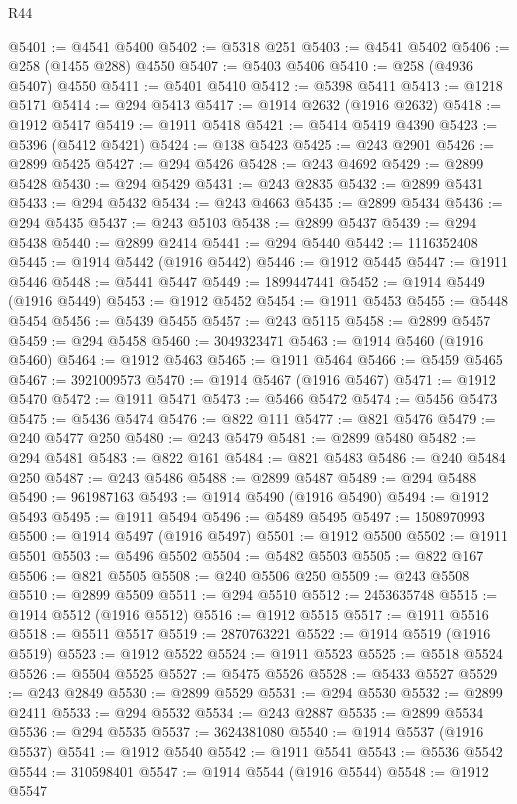 \begin{lexlean}{R44}
\begin{coremodule}
{@5401 := @4541 @5400
@5402 := @5318 @251
@5403 := @4541 @5402
@5406 := @258 (@1455 @288) @4550
@5407 := @5403 @5406
@5410 := @258 (@4936 @5407) @4550
@5411 := @5401 @5410
@5412 := @5398 @5411
@5413 := @1218 @5171
@5414 := @294 @5413
@5417 := @1914 @2632 (@1916 @2632)
@5418 := @1912 @5417
@5419 := @1911 @5418
@5421 := @5414 @5419 @4390
@5423 := @5396 (@5412 @5421)
@5424 := @138 @5423
@5425 := @243 @2901
@5426 := @2899 @5425
@5427 := @294 @5426
@5428 := @243 @4692
@5429 := @2899 @5428
@5430 := @294 @5429
@5431 := @243 @2835
@5432 := @2899 @5431
@5433 := @294 @5432
@5434 := @243 @4663
@5435 := @2899 @5434
@5436 := @294 @5435
@5437 := @243 @5103
@5438 := @2899 @5437
@5439 := @294 @5438
@5440 := @2899 @2414
@5441 := @294 @5440
@5442 := 1116352408
@5445 := @1914 @5442 (@1916 @5442)
@5446 := @1912 @5445
@5447 := @1911 @5446
@5448 := @5441 @5447
@5449 := 1899447441
@5452 := @1914 @5449 (@1916 @5449)
@5453 := @1912 @5452
@5454 := @1911 @5453
@5455 := @5448 @5454
@5456 := @5439 @5455
@5457 := @243 @5115
@5458 := @2899 @5457
@5459 := @294 @5458
@5460 := 3049323471
@5463 := @1914 @5460 (@1916 @5460)
@5464 := @1912 @5463
@5465 := @1911 @5464
@5466 := @5459 @5465
@5467 := 3921009573
@5470 := @1914 @5467 (@1916 @5467)
@5471 := @1912 @5470
@5472 := @1911 @5471
@5473 := @5466 @5472
@5474 := @5456 @5473
@5475 := @5436 @5474
@5476 := @822 @111
@5477 := @821 @5476
@5479 := @240 @5477 @250
@5480 := @243 @5479
@5481 := @2899 @5480
@5482 := @294 @5481
@5483 := @822 @161
@5484 := @821 @5483
@5486 := @240 @5484 @250
@5487 := @243 @5486
@5488 := @2899 @5487
@5489 := @294 @5488
@5490 := 961987163
@5493 := @1914 @5490 (@1916 @5490)
@5494 := @1912 @5493
@5495 := @1911 @5494
@5496 := @5489 @5495
@5497 := 1508970993
@5500 := @1914 @5497 (@1916 @5497)
@5501 := @1912 @5500
@5502 := @1911 @5501
@5503 := @5496 @5502
@5504 := @5482 @5503
@5505 := @822 @167
@5506 := @821 @5505
@5508 := @240 @5506 @250
@5509 := @243 @5508
@5510 := @2899 @5509
@5511 := @294 @5510
@5512 := 2453635748
@5515 := @1914 @5512 (@1916 @5512)
@5516 := @1912 @5515
@5517 := @1911 @5516
@5518 := @5511 @5517
@5519 := 2870763221
@5522 := @1914 @5519 (@1916 @5519)
@5523 := @1912 @5522
@5524 := @1911 @5523
@5525 := @5518 @5524
@5526 := @5504 @5525
@5527 := @5475 @5526
@5528 := @5433 @5527
@5529 := @243 @2849
@5530 := @2899 @5529
@5531 := @294 @5530
@5532 := @2899 @2411
@5533 := @294 @5532
@5534 := @243 @2887
@5535 := @2899 @5534
@5536 := @294 @5535
@5537 := 3624381080
@5540 := @1914 @5537 (@1916 @5537)
@5541 := @1912 @5540
@5542 := @1911 @5541
@5543 := @5536 @5542
@5544 := 310598401
@5547 := @1914 @5544 (@1916 @5544)
@5548 := @1912 @5547
}
\end{coremodule}
\end{lexlean}
